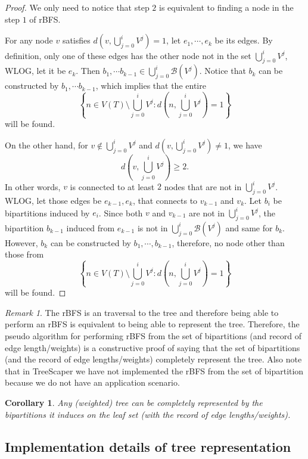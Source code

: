 \documentclass[11pt]{article}
\theoremstyle{definition}
\theoremstyle{remark}
\newtheorem{remark}[defn]{Remark}
\theoremstyle{plain}
\newtheorem{coro}[defn]{Corollary}
\begin{document}
\begin{proof}
	We only need to notice that step $2$ is equivalent to finding a node in the step $1$ of rBFS.

	For any node $v$ satisfies $d\left(v, \bigcup_{j=0}^i V^j\right) = 1$, let $e_1,\cdots, e_k$ be its edges. By definition, only one of these edges has the other node not in the set $\bigcup_{j=0}^i V^j$, WLOG, let it be $e_k$. Then $b_1,\cdots b_{k-1}\in \bigcup_{j=0}^i \mathcal{B}(V^j)$. Notice that $b_k$ can be constructed by $b_1,\cdots b_{k-1}$, which implies that the entire
	\[
		\left\{n\in V(T)\setminus \bigcup_{j=0}^{i}V^j: d\left(n, \bigcup_{j=0}^i V^j\right) = 1\right\}
	\]
	will be found.

	On the other hand, for $v\notin \bigcup_{j=0}^i V^j$ and $d\left(v, \bigcup_{j=0}^i V^j\right)\neq 1$, we have 
	\[
		d\left(v, \bigcup_{j=0}^i V^j\right)\geq 2.
	\]
	In other words, $v$ is connected to at least $2$ nodes that are not in $\bigcup_{j=0}^i V^j$. WLOG, let those edges be $e_{k-1}, e_{k}$, that connects to $v_{k-1}$ and $v_{k}$. Let $b_i$ be bipartitions induced by $e_i$. Since both $v$ and $v_{k-1}$ are not in $\bigcup_{j=0}^i V^j$, the bipartition $b_{k-1}$ induced from $e_{k-1}$ is not in $\bigcup_{j=0}^i \mathcal{B}(V^j)$ and same for $b_{k}$. However, $b_k$ can be constructed by $b_1,\cdots, b_{k-1}$, therefore, no node other than those from 
	\[
		\left\{n\in V(T)\setminus \bigcup_{j=0}^{i}V^j: d\left(n, \bigcup_{j=0}^i V^j\right) = 1\right\}
	\]
	will be found.
\end{proof}

\begin{remark}
	The rBFS is an traversal to the tree and therefore being able to perform an rBFS is equivalent to being able to represent the tree. Therefore, the pseudo algorithm for performing rBFS from the set of bipartitions (and record of edge length/weights) is a constructive proof of saying that the set of bipartitions (and the record of edge lengths/weights) completely represent the tree. Also note that in TreeScaper we have not implemented the rBFS from the set of bipartition because we do not have an application scenario.
\end{remark}

\begin{coro}
	Any (weighted) tree can be completely represented by the bipartitions it induces on the leaf set (with the record of edge lengths/weights).
\end{coro}


\subsection{Implementation details of tree representation}
\end{document}
